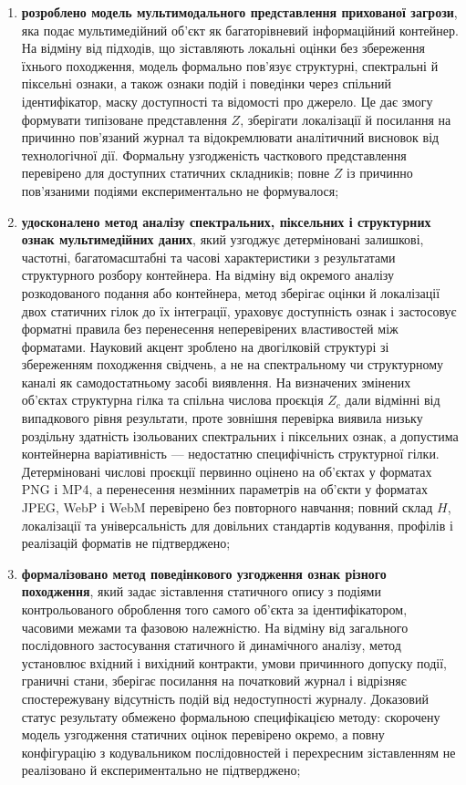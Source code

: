 \begin{enumerate}[label=\arabic*)]
\item \textbf{розроблено модель мультимодального представлення прихованої загрози}, яка подає мультимедійний об’єкт як багаторівневий інформаційний контейнер. На відміну від підходів, що зіставляють локальні оцінки без збереження їхнього походження, модель формально пов’язує структурні, спектральні й піксельні ознаки, а також ознаки подій і поведінки через спільний ідентифікатор, маску доступності та відомості про джерело. Це дає змогу формувати типізоване представлення $Z$, зберігати локалізації й посилання на причинно пов’язаний журнал та відокремлювати аналітичний висновок від технологічної дії. Формальну узгодженість часткового представлення перевірено для доступних статичних складників; повне $Z$ із причинно пов’язаними подіями експериментально не формувалося;

\item \textbf{удосконалено метод аналізу спектральних, піксельних і структурних ознак мультимедійних даних}, який узгоджує детерміновані залишкові, частотні, багатомасштабні та часові характеристики з результатами структурного розбору контейнера. На відміну від окремого аналізу розкодованого подання або контейнера, метод зберігає оцінки й локалізації двох статичних гілок до їх інтеграції, ураховує доступність ознак і застосовує форматні правила без перенесення неперевірених властивостей між форматами. Науковий акцент зроблено на двогілковій структурі зі збереженням походження свідчень, а не на спектральному чи структурному каналі як самодостатньому засобі виявлення. На визначених змінених об’єктах структурна гілка та спільна числова проєкція $Z_c$ дали відмінні від випадкового рівня результати, проте зовнішня перевірка виявила низьку роздільну здатність ізольованих спектральних і піксельних ознак, а допустима контейнерна варіативність --- недостатню специфічність структурної гілки. Детерміновані числові проєкції первинно оцінено на об’єктах у форматах PNG і MP4, а перенесення незмінних параметрів на об’єкти у форматах JPEG, WebP і WebM перевірено без повторного навчання; повний склад $H$, локалізації та універсальність для довільних стандартів кодування, профілів і реалізацій форматів не підтверджено;

\item \textbf{формалізовано метод поведінкового узгодження ознак різного походження}, який задає зіставлення статичного опису з подіями контрольованого оброблення того самого об’єкта за ідентифікатором, часовими межами та фазовою належністю. На відміну від загального послідовного застосування статичного й динамічного аналізу, метод установлює вхідний і вихідний контракти, умови причинного допуску події, граничні стани, зберігає посилання на початковий журнал і відрізняє спостережувану відсутність подій від недоступності журналу. Доказовий статус результату обмежено формальною специфікацією методу: скорочену модель узгодження статичних оцінок перевірено окремо, а повну конфігурацію з кодувальником послідовностей і перехресним зіставленням не реалізовано й експериментально не підтверджено;


\end{enumerate}
